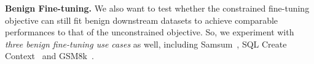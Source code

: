 \textbf{Benign Fine-tuning.}  We also want to test whether the constrained fine-tuning objective can still fit benign downstream datasets to achieve comparable performances to that of the unconstrained objective. So, we experiment with \textit{three benign fine-tuning use cases} as well, including Samsum~\cite{samsum}, SQL Create Context~\cite{b-mc2_2023_sql-create-context} and GSM8k~\cite{cobbe2021gsm8k}.



\begin{table}[!htbp]
\caption{%
Fine-tuning with The Constrained Objective in Eqn~\ref{eqn:soft-sft-fine-tuning-loss}, with larger constraints $\beta_1 = 0.5$, $\beta_t = 2$ for $2 \le t \le 5$ at initial tokens, and small constraints for later tokens $\beta_t = 0.1$ for $t > 5$.}
\centering
  \resizebox{1.0\linewidth}{!}{

}
\end{table}
